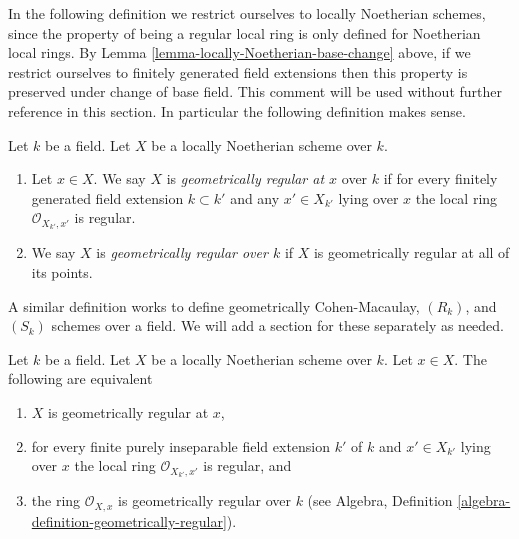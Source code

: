 \medskip\noindent
In the following definition we restrict ourselves to locally Noetherian
schemes, since the property of being a regular local ring is only
defined for Noetherian local rings. By
Lemma \ref{lemma-locally-Noetherian-base-change}
above, if we restrict ourselves to finitely generated field extensions then
this property is preserved under change of base field. This comment will be
used without further reference in this section. In particular the following
definition makes sense.

\begin{definition}
\label{definition-geometrically-regular}
Let $k$ be a field. Let $X$ be a locally Noetherian scheme over $k$.
\begin{enumerate}
\item Let $x \in X$. We say $X$ is {\it geometrically regular at $x$}
over $k$ if for every finitely generated field extension $k \subset k'$
and any $x' \in X_{k'}$ lying over $x$ the local ring
$\mathcal{O}_{X_{k'}, x'}$ is regular.
\item We say $X$ is {\it geometrically regular over $k$} if
$X$ is geometrically regular at all of its points.
\end{enumerate}
\end{definition}

\noindent
A similar definition works to define geometrically
Cohen-Macaulay, $(R_k)$, and $(S_k)$ schemes over a field.
We will add a section for these separately as needed.

\begin{lemma}
\label{lemma-geometrically-regular-at-point}
Let $k$ be a field.
Let $X$ be a locally Noetherian scheme over $k$.
Let $x \in X$.
The following are equivalent
\begin{enumerate}
\item $X$ is geometrically regular at $x$,
\item for every finite purely inseparable field extension $k'$ of $k$
and $x' \in X_{k'}$ lying over $x$ the local ring
$\mathcal{O}_{X_{k'}, x'}$ is regular, and
\item the ring $\mathcal{O}_{X, x}$ is geometrically
regular over $k$ (see
Algebra, Definition \ref{algebra-definition-geometrically-regular}).
\end{enumerate}
\end{lemma}

